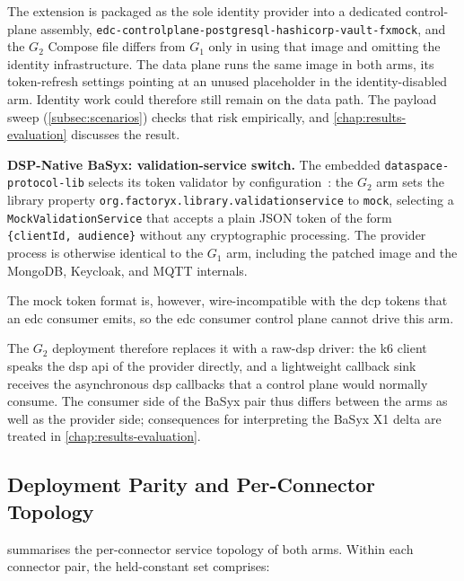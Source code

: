 The extension is packaged as the sole identity provider into a dedicated control-plane assembly, \texttt{edc-controlplane-\allowbreak postgresql-\allowbreak hashicorp-\allowbreak vault-\allowbreak fxmock}, and the $G_2$ Compose file differs from $G_1$ only in using that image and omitting the identity infrastructure. The data plane runs the same image in both arms, its token-refresh settings pointing at an unused placeholder in the identity-disabled arm. Identity work could therefore still remain on the data path. The payload sweep (\cref{subsec:scenarios}) checks that risk empirically, and \cref{chap:results-evaluation} discusses the result.

\textbf{DSP-Native BaSyx: validation-service switch.} The embedded \texttt{dataspace-\allowbreak protocol-\allowbreak lib} selects its token validator by configuration~\citep{dspProtocolLib}: the $G_2$ arm sets the library property \texttt{org.factoryx.\allowbreak library.\allowbreak validationservice} to \texttt{mock}, selecting a \texttt{MockValidationService} that accepts a plain JSON token of the form \texttt{\{clientId, audience\}} without any cryptographic processing. The provider process is otherwise identical to the $G_1$ arm, including the patched image and the MongoDB, Keycloak, and MQTT internals.

The mock token format is, however, wire-incompatible with the \gls{dcp} tokens that an \gls{edc} consumer emits, so the \gls{edc} consumer control plane cannot drive this arm.

The $G_2$ deployment therefore replaces it with a raw-\gls{dsp} driver: the k6 client speaks the \gls{dsp} \gls{api} of the provider directly, and a lightweight callback sink receives the asynchronous \gls{dsp} callbacks that a control plane would normally consume. The consumer side of the BaSyx pair thus differs between the arms as well as the provider side; consequences for interpreting the BaSyx X1 delta are treated in \cref{chap:results-evaluation}.

\subsection{Deployment Parity and Per-Connector Topology}\label{subsec:parity}

 summarises the per-connector service topology of both arms. Within each connector pair, the held-constant set comprises:

